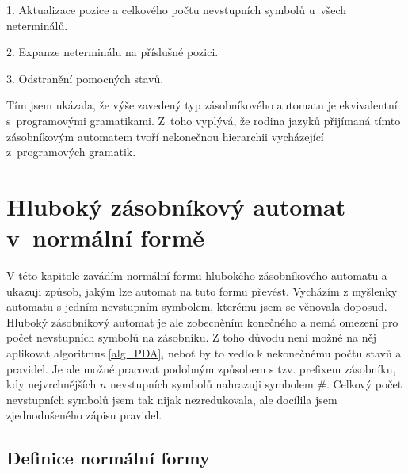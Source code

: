 \begin{list}{}{\setlength\parsep{0cm} \setlength\itemsep{0cm} \setlength\leftmargin{1em}}
\item 1. Aktualizace pozice a celkového počtu nevstupních symbolů u~všech neterminálů.
\item 2. Expanze neterminálu na příslušné pozici.
\item 3. Odstranění pomocných stavů.
\end{list}

Tím jsem ukázala, že výše zavedený typ zásobníkového automatu je ekvivalentní s~programovými gramatikami. Z~toho vyplývá, že rodina jazyků přijímaná tímto zásobníkovým automatem tvoří nekonečnou hierarchii vycházející z~programových gramatik.

\chapter{Hluboký zásobníkový automat v~normální formě}

V této kapitole zavádím normální formu hlubokého zásobníkového automatu a ukazuji způsob, jakým lze automat na tuto formu převést. Vycházím z myšlenky automatu s jedním nevstupním symbolem, kterému jsem se věnovala doposud. Hluboký zásobníkový automat je ale zobecněním konečného a nemá omezení pro počet nevstupních symbolů na zásobníku. Z toho důvodu není možné na něj aplikovat algoritmus \ref{alg_PDA}, neboť by to vedlo k nekonečnému počtu stavů a pravidel. Je ale možné pracovat podobným způsobem s tzv. prefixem zásobníku, kdy nejvrchnějších $n$ nevstupních symbolů nahrazuji symbolem $\#$. Celkový počet nevstupních symbolů jsem tak nijak nezredukovala, ale docílila jsem zjednodušeného zápisu pravidel.


\section{Definice normální formy}

